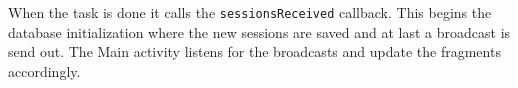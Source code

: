 When the task is done it calls the \verb|sessionsReceived| callback. This begins the database initialization where the new sessions are saved and at last a broadcast is send out. The Main activity listens for the broadcasts and update the fragments accordingly.

